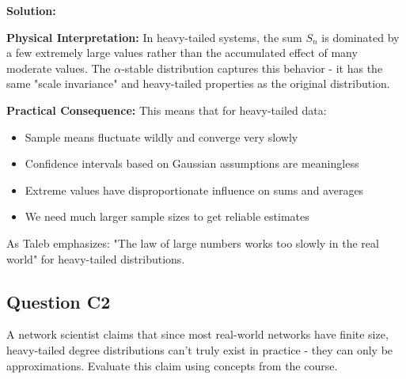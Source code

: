\documentclass[11pt]{article}
\newenvironment{solution}
{\color{solutioncolor}\begin{framed}\textbf{Solution:}\par}
{\end{framed}}
\begin{document}
\begin{solution}
\textbf{Physical Interpretation:}
In heavy-tailed systems, the sum $S_n$ is dominated by a few extremely large values rather than the accumulated effect of many moderate values. The $\alpha$-stable distribution captures this behavior - it has the same "scale invariance" and heavy-tailed properties as the original distribution.

\textbf{Practical Consequence:}
This means that for heavy-tailed data:
\begin{itemize}
\item Sample means fluctuate wildly and converge very slowly
\item Confidence intervals based on Gaussian assumptions are meaningless
\item Extreme values have disproportionate influence on sums and averages
\item We need much larger sample sizes to get reliable estimates
\end{itemize}

As Taleb emphasizes: "The law of large numbers works too slowly in the real world" for heavy-tailed distributions.
\end{solution}

\subsection{Question C2}
A network scientist claims that since most real-world networks have finite size, heavy-tailed degree distributions can't truly exist in practice - they can only be approximations. Evaluate this claim using concepts from the course.
\end{document}
